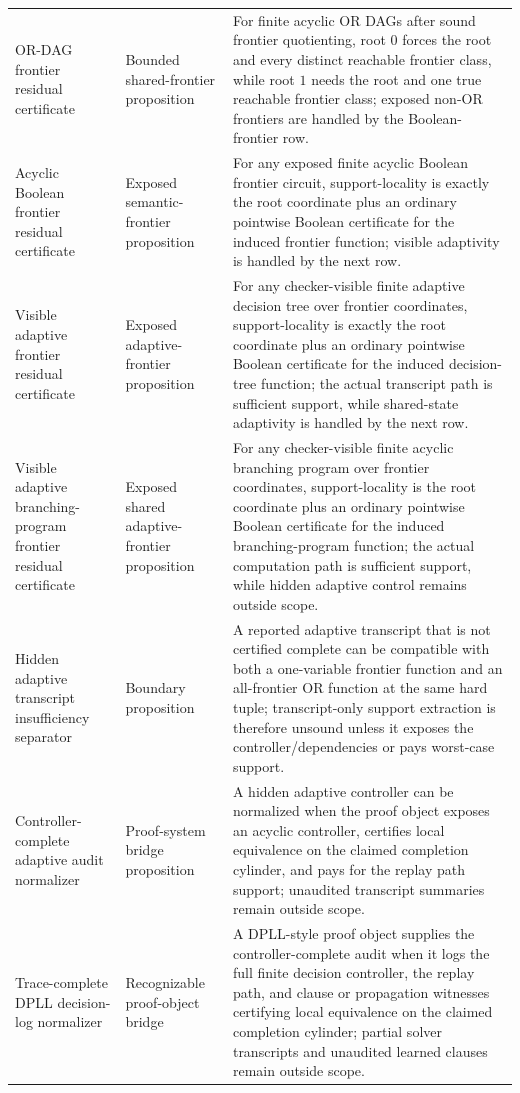 \documentclass[11pt]{article}
\theoremstyle{definition}
\begin{document}
{\begin{longtable}{@{}p{}p{}p{}@{}}
OR-DAG frontier residual certificate & Bounded shared-frontier proposition & For finite acyclic OR DAGs after sound frontier quotienting, root \(0\) forces the root and every distinct reachable frontier class, while root \(1\) needs the root and one true reachable frontier class; exposed non-OR frontiers are handled by the Boolean-frontier row. \\
Acyclic Boolean frontier residual certificate & Exposed semantic-frontier proposition & For any exposed finite acyclic Boolean frontier circuit, support-locality is exactly the root coordinate plus an ordinary pointwise Boolean certificate for the induced frontier function; visible adaptivity is handled by the next row. \\
Visible adaptive frontier residual certificate & Exposed adaptive-frontier proposition & For any checker-visible finite adaptive decision tree over frontier coordinates, support-locality is exactly the root coordinate plus an ordinary pointwise Boolean certificate for the induced decision-tree function; the actual transcript path is sufficient support, while shared-state adaptivity is handled by the next row. \\
Visible adaptive branching-program frontier residual certificate & Exposed shared adaptive-frontier proposition & For any checker-visible finite acyclic branching program over frontier coordinates, support-locality is the root coordinate plus an ordinary pointwise Boolean certificate for the induced branching-program function; the actual computation path is sufficient support, while hidden adaptive control remains outside scope. \\
Hidden adaptive transcript insufficiency separator & Boundary proposition & A reported adaptive transcript that is not certified complete can be compatible with both a one-variable frontier function and an all-frontier OR function at the same hard tuple; transcript-only support extraction is therefore unsound unless it exposes the controller/dependencies or pays worst-case support. \\
Controller-complete adaptive audit normalizer & Proof-system bridge proposition & A hidden adaptive controller can be normalized when the proof object exposes an acyclic controller, certifies local equivalence on the claimed completion cylinder, and pays for the replay path support; unaudited transcript summaries remain outside scope. \\
Trace-complete DPLL decision-log normalizer & Recognizable proof-object bridge & A DPLL-style proof object supplies the controller-complete audit when it logs the full finite decision controller, the replay path, and clause or propagation witnesses certifying local equivalence on the claimed completion cylinder; partial solver transcripts and unaudited learned clauses remain outside scope. \\

\end{longtable}}
\end{document}
